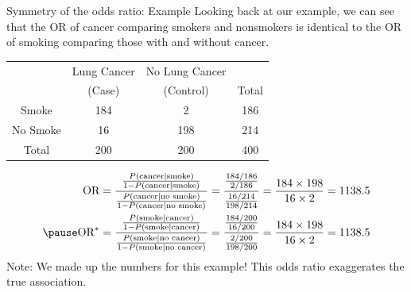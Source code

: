 \documentclass[10pt,t]{beamer}
\begin{document}
\begin{frame}{Symmetry of the odds ratio: Example}
	\vspace{-0.8cm}
	Looking back at our example, we can see that the OR of cancer comparing smokers and nonsmokers is identical to the OR of smoking comparing those with and without cancer. 
	\begin{center}
		\begin{table}
			\begin{tabular}{|c|cc|c|}
				\hline 
				& Lung Cancer & No Lung Cancer &  \\ 
				& (Case) & (Control) & Total  \\
				\hline 
				Smoke & 184 & 2  & 186 \\ 
				No Smoke & 16 & 198 & 214  \\ 
				\hline 
				Total & 200 & 200 & 400 \\ 
				\hline 
			\end{tabular}
		\end{table}\pause
	\end{center}
	\begin{align*}
		\text{OR} = \frac{\frac{P(\text{cancer} \mid \text{smoke})}{1 - P(\text{cancer} \mid \text{smoke})}}{\frac{P(\text{cancer} \mid \text{no smoke})}{1 - P(\text{cancer} \mid \text{no smoke})}}  = \frac{\frac{184/186}{2/186}}{\frac{16/214}{198/214}} = \frac{184\times 198}{16 \times 2} = 1138.5\\ \pause
		\text{OR}^* =\frac{\frac{P(\text{smoke} \mid \text{cancer})}{1 - P(\text{smoke} \mid \text{cancer})}}{\frac{P(\text{smoke} \mid \text{no cancer})}{1 - P(\text{smoke} \mid \text{no cancer})}}  = \frac{\frac{184/200}{16/200}}{\frac{2/200}{198/200}} = \frac{184\times 198}{16 \times 2} = 1138.5
	\end{align*}
\vfill 
\tiny Note: We made up the numbers for this example! This odds ratio exaggerates the true association.

\end{frame}
\end{document}
